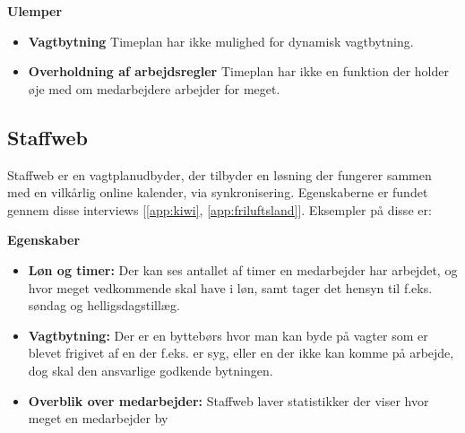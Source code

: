 \textbf{Ulemper}
\begin{itemize}
\item {\textbf{Vagtbytning} Timeplan har ikke mulighed for dynamisk vagtbytning.}
\item {\textbf{Overholdning af arbejdsregler} Timeplan har ikke en funktion der holder øje med om medarbejdere arbejder for meget.}\\
\end{itemize}

\subsection{Staffweb}

Staffweb er en vagtplanudbyder, der tilbyder en løsning der fungerer sammen med en vilkårlig online kalender, via synkronisering. Egenskaberne er fundet gennem disse interviews [\ref{app:kiwi}, \ref{app:friluftsland}]. Eksempler på disse er:

\textbf{Egenskaber} 
\begin{itemize}
    \item {\textbf{Løn og timer:} Der kan ses antallet af timer en medarbejder har arbejdet, og hvor meget vedkommende skal have i løn, samt tager det hensyn til f.eks. søndag og helligsdagstillæg.}
    \item {\textbf{Vagtbytning:} Der er en byttebørs hvor man kan byde på vagter som er blevet frigivet af en der f.eks. er syg, eller en der ikke kan komme på arbejde, dog skal den ansvarlige godkende bytningen.}
    \item {\textbf{Overblik over medarbejder:} Staffweb laver statistikker der viser hvor meget en medarbejder by}
\end{itemize}

